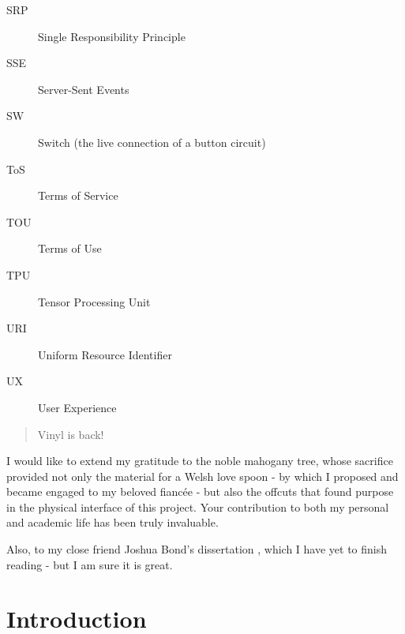 \begin{description}
        \item[SRP] Single Responsibility Principle
        \item[SSE] Server-Sent Events
        \item[SW] Switch (the live connection of a button circuit) 
        \item[ToS] Terms of Service
        \item[TOU] Terms of Use
        \item[TPU] Tensor Processing Unit 
        \item[URI] Uniform Resource Identifier
        \item[UX] User Experience
      \end{description}
    
    \begin{abstract} %
      Vinyl is back!
    
    \end{abstract}%
    \clearpage
    
    
    
    \uomdeclarations %
    
    
    
    \begin{uomacknowledgements}
    I would like to extend my gratitude to the noble mahogany tree, whose sacrifice provided not only the material for a Welsh love spoon - by which I proposed and became engaged to my beloved fiancée - but also the offcuts that found purpose in the physical interface of this project. Your contribution to both my personal and academic life has been truly invaluable.
    
    Also, to my close friend Joshua Bond’s dissertation \cite{jdbond}, which I have yet to finish reading - but I am sure it is great.
    \end{uomacknowledgements}
    
    
    \section{Introduction}
    
    
